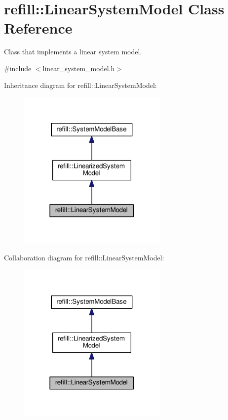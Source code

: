 \hypertarget{classrefill_1_1LinearSystemModel}{}\section{refill\+:\+:Linear\+System\+Model Class Reference}
\label{classrefill_1_1LinearSystemModel}


Class that implements a linear system model.  




{\ttfamily \#include $<$linear\+\_\+system\+\_\+model.\+h$>$}



Inheritance diagram for refill\+:\+:Linear\+System\+Model\+:\nopagebreak
\begin{figure}[H]
\begin{center}
\leavevmode
\includegraphics[width=207pt]{classrefill_1_1LinearSystemModel__inherit__graph}
\end{center}
\end{figure}


Collaboration diagram for refill\+:\+:Linear\+System\+Model\+:\nopagebreak
\begin{figure}[H]
\begin{center}
\leavevmode
\includegraphics[width=207pt]{classrefill_1_1LinearSystemModel__coll__graph}
\end{center}
\end{figure}
